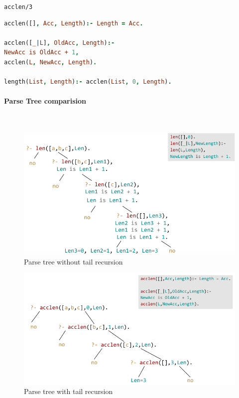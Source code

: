 \lstinline|acclen/3|

\begin{lstlisting}[language=Prolog]
acclen([], Acc, Length):- Length = Acc.

acclen([_|L], OldAcc, Length):-
NewAcc is OldAcc + 1,
acclen(L, NewAcc, Length).

length(List, Length):- acclen(List, 0, Length).
\end{lstlisting}

\paragraph{Parse Tree comparision} \hfill \\

\begin{figure}[h]
	\centering
	\includegraphics[width=0.5\linewidth]{images/parse_tree_acclen_2}
	\caption{Parse tree without tail recursion}
	\label{fig:parsetreeacclen2}
\end{figure}

\begin{figure}[h]
\centering
\includegraphics[width=0.5\linewidth]{images/parse_tree_acclen_tail_recursion}
\caption{Parse tree with tail recursion}
\label{fig:parsetreeacclentailrecursion}
\end{figure}


